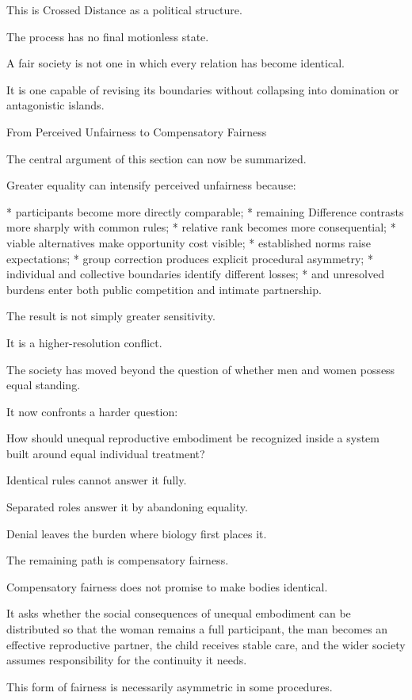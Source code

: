 This is Crossed Distance as a political structure.

The process has no final motionless state.

A fair society is not one in which every relation has become identical.

It is one capable of revising its boundaries without collapsing into domination or antagonistic islands.

From Perceived Unfairness to Compensatory Fairness

The central argument of this section can now be summarized.

Greater equality can intensify perceived unfairness because:

* participants become more directly comparable;
* remaining Difference contrasts more sharply with common rules;
* relative rank becomes more consequential;
* viable alternatives make opportunity cost visible;
* established norms raise expectations;
* group correction produces explicit procedural asymmetry;
* individual and collective boundaries identify different losses;
* and unresolved burdens enter both public competition and intimate partnership.

The result is not simply greater sensitivity.

It is a higher-resolution conflict.

The society has moved beyond the question of whether men and women possess equal standing.

It now confronts a harder question:

How should unequal reproductive embodiment be recognized inside a system built around equal individual treatment?

Identical rules cannot answer it fully.

Separated roles answer it by abandoning equality.

Denial leaves the burden where biology first places it.

The remaining path is compensatory fairness.

Compensatory fairness does not promise to make bodies identical.

It asks whether the social consequences of unequal embodiment can be distributed so that the woman remains a full participant, the man becomes an effective reproductive partner, the child receives stable care, and the wider society assumes responsibility for the continuity it needs.

This form of fairness is necessarily asymmetric in some procedures.

